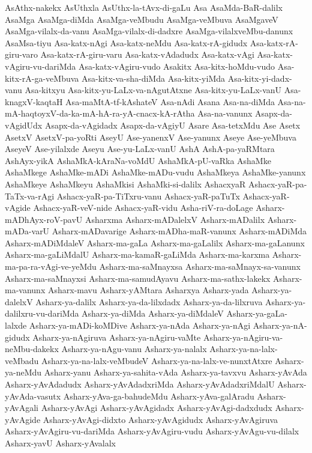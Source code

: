 {AsAthx-nakekx
AsUthxla
AsUthx-la-tAvx-di-gaLu
Asa
AsaMda-BaR-dalilx
AsaMga
AsaMga-diMda
AsaMga-veMbudu
AsaMga-veMbuva
AsaMgaveV
AsaMga-vilalx-da-vanu
AsaMga-vilalx-di-dadxre
AsaMga-vilalxveMbu-danunx
AsaMsa-tiyu
Asa-katx-nAgi
Asa-katx-neMdu
Asa-katx-rA-gidudx
Asa-katx-rA-giru-varo
Asa-katx-rA-giru-varu
Asa-katx-vAdadudx
Asa-katx-vAgi
Asa-katx-vAgiru-vu-dariMda
Asa-katx-vAgiru-vudo
Asakitx
Asa-kitx-hoMdu-vudo
Asa-kitx-rA-ga-veMbuva
Asa-kitx-va-sha-diMda
Asa-kitx-yiMda
Asa-kitx-yi-dadx-vanu
Asa-kitxyu
Asa-kitx-yu-LaLx-va-nAgutAtxne
Asa-kitx-yu-LaLx-vanU
Asa-knagxV-kaqtaH
Asa-maMtA-tf-kAshateV
Asa-nAdi
Asana
Asa-na-diMda
Asa-na-mA-haqtoyxV-da-ka-mA-hA-ra-yA-cnacx-kA-rAtha
Asa-na-vanunx
Asapx-da-vAgidUdx
Asapx-da-vAgidadx
Asapx-da-vAgiyU
Asare
Asa-tetxMdu
Ase
Asetx
AsetxV
AsetxV-pa-yoRti
AseyU
Ase-yanenxV
Ase-yanunx
Aseye
Ase-yeMbuva
AseyeV
Ase-yilalxde
Aseyu
Ase-yu-LaLx-vanU
AshA
AshA-pa-yaRMtara
AshAyx-yikA
AshaMkA-kAraNa-voMdU
AshaMkA-pU-vaRka
AshaMke
AshaMkege
AshaMke-mADi
AshaMke-mADu-vudu
AshaMkeya
AshaMke-yanunx
AshaMkeye
AshaMkeyu
AshaMkisi
AshaMki-si-dalilx
AshacxyaR
Ashacx-yaR-pa-TaTx-va-rAgi
Ashacx-yaR-pa-TiTxru-vanu
Ashacx-yaR-paTuTx
Ashacx-yaR-vAgide
Ashacx-yaR-veV-nide
Ashacx-yaR-vidu
Asha-riV-ra-doLage
Asharx-mADhAyx-roV-pavU
Asharxma
Asharx-mADalelxV
Asharx-mADalilx
Asharx-mADa-varU
Asharx-mADavarige
Asharx-mADha-maR-vanunx
Asharx-mADiMda
Asharx-mADiMdaleV
Asharx-ma-gaLa
Asharx-ma-gaLalilx
Asharx-ma-gaLanunx
Asharx-ma-gaLiMdalU
Asharx-ma-kamaR-gaLiMda
Asharx-ma-karxma
Asharx-ma-pa-ra-vAgi-ve-yeMdu
Asharx-ma-saMnayxsa
Asharx-ma-saMnayx-sa-vanunx
Asharx-ma-saMnayxsi
Asharx-ma-samudAyavu
Asharx-ma-sathx-lakekx
Asharx-ma-vanunx
Asharx-mavu
Asharx-yAMtara
Asharxya
Asharx-yada
Asharx-ya-dalelxV
Asharx-ya-dalilx
Asharx-ya-da-lilxdadx
Asharx-ya-da-lilxruva
Asharx-ya-dalilxru-vu-dariMda
Asharx-ya-diMda
Asharx-ya-diMdaleV
Asharx-ya-gaLa-lalxde
Asharx-ya-mADi-koMDive
Asharx-ya-nAda
Asharx-ya-nAgi
Asharx-ya-nA-gidudx
Asharx-ya-nAgiruva
Asharx-ya-nAgiru-vaMte
Asharx-ya-nAgiru-va-neMbu-dakekx
Asharx-ya-nAgu-vanu
Asharx-ya-nalalx
Asharx-ya-na-lalx-veMbadu
Asharx-ya-na-lalx-veMbudeV
Asharx-ya-na-lalx-ve-nunxtAtxre
Asharx-ya-neMdu
Asharx-yanu
Asharx-ya-sahita-vAda
Asharx-ya-tavxvu
Asharx-yAvAda
Asharx-yAvAdadudx
Asharx-yAvAdadxriMda
Asharx-yAvAdadxriMdalU
Asharx-yAvAda-vasutx
Asharx-yAva-ga-bahudeMdu
Asharx-yAva-galAradu
Asharx-yAvAgali
Asharx-yAvAgi
Asharx-yAvAgidadx
Asharx-yAvAgi-dadxdudx
Asharx-yAvAgide
Asharx-yAvAgi-didxto
Asharx-yAvAgidudx
Asharx-yAvAgiruva
Asharx-yAvAgiru-vu-dariMda
Asharx-yAvAgiru-vudu
Asharx-yAvAgu-vu-dilalx
Asharx-yavU
Asharx-yAvalalx
}
